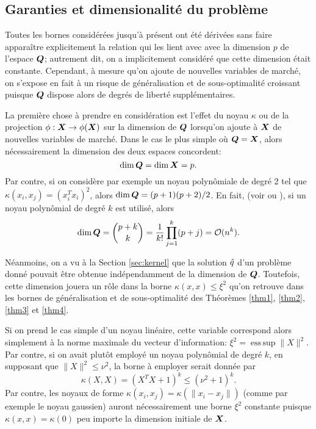 \subsection{Garanties et dimensionalité du problème}
\label{b:dim}

Toutes les bornes considérées jusqu'à présent ont été dérivées sans faire apparaître
explicitement la relation qui les lient avec avec la dimension $p$ de l'espace $\bm Q$;
autrement dit, on a implicitement considéré que cette dimension était
constante. Cependant, à mesure qu'on ajoute de nouvelles variables de marché, on s'expose
en fait à un risque de généralisation et de sous-optimalité croissant puisque $\bm Q$ dispose
alors de degrés de liberté supplémentaires.

La première chose à prendre en considération est l'effet du noyau $\kappa$ ou de la projection
$\phi:\bm{X}\to\phi(\bm{X})$ sur la dimension de $\bm Q$ lorsqu'on ajoute à $\bm{X}$ de nouvelles variables de
marché. Dans le cas le plus simple où $\bm Q = \bm{X}$, alors nécessairement la dimension des
deux espaces concordent:
\begin{equation}
  \dim\bm Q = \dim\bm{X} = p.
\end{equation}
Par contre, si on considère par exemple un noyau polynômiale de degré 2 tel que
$\kappa(x_i,x_j) = (x_i^Tx_i)^2$, alors $\dim\bm Q = (p+1)(p+2)/2$. En fait, (voir
\cite{mohri2012foundations} ou \cite{bishop2006pattern}), si un noyau polynômial de degré
$k$ est utilisé, alors
\begin{equation}
  \dim\bm Q = \binom{p+k}{k} = \frac{1}{k!}\prod_{j=1}^k(p+j) = \mathcal O(n^k).
\end{equation}

Néanmoins, on a vu à la Section \ref{sec:kernel} que la solution $\hat q$ d'un problème donné
pouvait être obtenue indépendamment de la dimension de $\bm Q$. Toutefois, cette dimension
jouera un rôle dans la borne $\kappa(x,x) \leq \xi^2$ qu'on retrouve dans les bornes de
généralisation et de sous-optimalité des Théorèmes \ref{thm1}, \ref{thm2}, \ref{thm3} et
\ref{thm4}.

Si on prend le cas simple d'un noyau linéaire, cette variable correspond alors simplement
à la norme maximale du vecteur d'information: $\xi^2 = \operatorname{ess\,sup}\|X\|^2$.  Par contre, si on
avait plutôt employé un noyau polynômial de degré $k$, en supposant que $\|X\|^2 \leq \nu^2$, la
borne à employer serait donnée par
\begin{equation}
\kappa(X,X) = (X^TX + 1)^k \leq (\nu^2 + 1)^k.
\end{equation}
Par contre, les noyaux de forme $\kappa(x_i,x_j) = \kappa(\|x_i - x_j\|)$ (comme par exemple le
noyau gaussien) auront nécessairement une borne $\xi^2$ constante puisque
$\kappa(x,x) = \kappa(0)$ peu importe la dimension initiale de $\bm{X}$.

